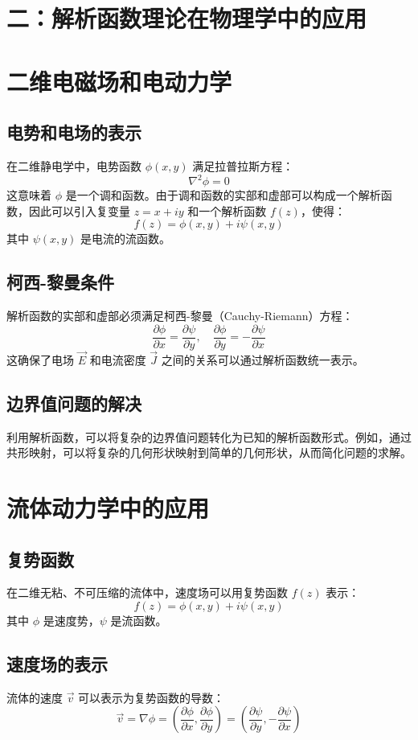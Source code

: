 \documentclass[12pt]{article}
\begin{document}
	
	\section*{二：解析函数理论在物理学中的应用}
	
	
	\section{二维电磁场和电动力学}
	
	\subsection{电势和电场的表示}
	在二维静电学中，电势函数 $\phi(x, y)$ 满足拉普拉斯方程：
	\[
	\nabla^2 \phi = 0
	\]
	这意味着 $\phi$ 是一个调和函数。由于调和函数的实部和虚部可以构成一个解析函数，因此可以引入复变量 $z = x + iy$ 和一个解析函数 $f(z)$，使得：
	\[
	f(z) = \phi(x, y) + i\psi(x, y)
	\]
	其中 $\psi(x, y)$ 是电流的流函数。
	
	\subsection{柯西-黎曼条件}
	解析函数的实部和虚部必须满足柯西-黎曼（Cauchy-Riemann）方程：
	\[
	\frac{\partial \phi}{\partial x} = \frac{\partial \psi}{\partial y}, \quad \frac{\partial \phi}{\partial y} = -\frac{\partial \psi}{\partial x}
	\]
	这确保了电场 $\vec{E}$ 和电流密度 $\vec{J}$ 之间的关系可以通过解析函数统一表示。
	
	\subsection{边界值问题的解决}
	利用解析函数，可以将复杂的边界值问题转化为已知的解析函数形式。例如，通过共形映射，可以将复杂的几何形状映射到简单的几何形状，从而简化问题的求解。
	
	\section{流体动力学中的应用}
	
	\subsection{复势函数}
	在二维无粘、不可压缩的流体中，速度场可以用复势函数 $f(z)$ 表示：
	\[
	f(z) = \phi(x, y) + i\psi(x, y)
	\]
	其中 $\phi$ 是速度势，$\psi$ 是流函数。
	
	\subsection{速度场的表示}
	流体的速度 $\vec{v}$ 可以表示为复势函数的导数：
	\[
	\vec{v} = \nabla \phi = \left(\frac{\partial \phi}{\partial x}, \frac{\partial \phi}{\partial y}\right) = \left(\frac{\partial \psi}{\partial y}, -\frac{\partial \psi}{\partial x}\right)
	\]
	
\end{document}
